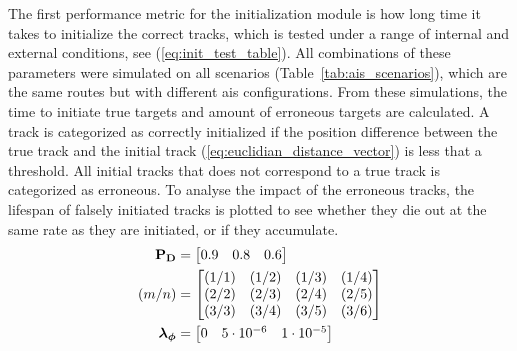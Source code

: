 The first performance metric for the initialization module is how long time it takes to initialize the correct tracks, which is tested under a range of internal and external conditions, see (\ref{eq:init_test_table}). All combinations of these parameters were simulated on all scenarios (Table~\ref{tab:ais_scenarios}), which are the same routes but with different \gls{ais} configurations. 
 From these simulations, the time to initiate true targets and amount of erroneous targets are calculated. A track is categorized as correctly initialized if the position difference between the true track and the initial track (\ref{eq:euclidian_distance_vector}) is less that a threshold. All initial tracks that does not correspond to a true track is categorized as erroneous. To analyse the impact of the erroneous tracks, the lifespan of falsely initiated tracks is plotted to see whether they die out at the same rate as they are initiated, or if they accumulate.
\begin{equation}\label{eq:init_test_table}
\begin{split}
\boldsymbol{\mathbf{P_D}} &= \begin{bmatrix} 0.9 & 0.8 & 0.6 \end{bmatrix} \\
(m/n) &= \begin{bmatrix} 	(1/1) & (1/2) & (1/3) & (1/4) \\
							(2/2) & (2/3) & (2/4) & (2/5) \\
							(3/3) & (3/4) & (3/5) & (3/6)
		   \end{bmatrix} \\
\boldsymbol{\mathbf{\lambda_\phi}} &= \begin{bmatrix} 0 & 5\cdot10^{-6} & 1\cdot10^{-5}\end{bmatrix}
\end{split}
\end{equation}

